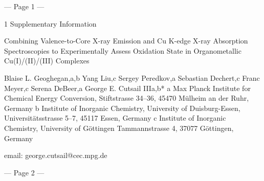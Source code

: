 --- Page 1 ---
 
1 
Supplementary Information 
 
Combining Valence-to-Core X-ray Emission and Cu K-edge X-ray Absorption 
Spectroscopies to Experimentally Assess Oxidation State in Organometallic 
Cu(I)/(II)/(III) Complexes 
 
Blaise L. Geoghegan,a,b Yang Liu,c Sergey Peredkov,a Sebastian Dechert,c Franc Meyer,c Serena DeBeer,a 
George E. Cutsail IIIa,b* 
a Max Planck Institute for Chemical Energy Conversion, Stiftstrasse 34–36, 45470 Mülheim an der Ruhr, 
Germany 
b Institute of Inorganic Chemistry, University of Duisburg-Essen, Universitätsstrasse 5–7, 45117 Essen, Germany 
c Institute of Inorganic Chemistry, University of Göttingen Tammannstrasse 4, 37077 Göttingen, Germany 
 
email: george.cutsail@cec.mpg.de 
 
 


--- Page 2 ---
 
